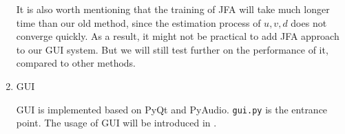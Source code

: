 \begin{enumerate}
      It is also worth mentioning that the training of JFA will take much longer time than our old method,
      since the estimation process of $ u, v, d$ does not converge quickly. As a result, it might not be practical to add
      JFA approach to our GUI system. But we will still test further on the performance of it, compared to other methods.

    \item GUI

      GUI is implemented based on PyQt\cite{pyqt} and PyAudio\cite{pyaudio}.
      \verb|gui.py| is the entrance point. The usage of GUI will be introduced in .
  \end{enumerate}

